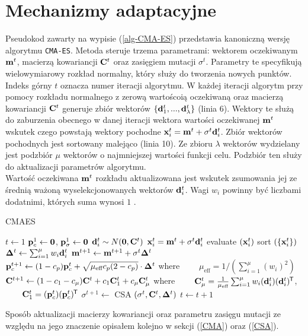 \section{Mechanizmy adaptacyjne}
\label{section:adaptacja}
Pseudokod zawarty na wypisie (\ref{alg-CMA-ES}) przedstawia kanoniczną wersję algorytmu \texttt{CMA-ES}. Metoda steruje trzema parametrami: wektorem oczekiwanym ${\bf m}^{t}$, macierzą kowariancji
${\bf C}^t$ oraz zasięgiem mutacji $\sigma^t$. Parametry te specyfikują wielowymiarowy rozkład normalny, który służy do tworzenia nowych punktów. Indeks górny $t$ oznacza numer iteracji algorytmu.
W każdej iteracji algorytm przy pomocy rozkładu normalnego z zerową wartoścoią oczekiwaną oraz macierzą kowariancji ${\bf C}^t$ generuje zbiór wektorów $\{{\bf d}_1^t,...,{\bf d}_\lambda^t\}$ (linia 6). 
Wektory te służą do zaburzenia obecnego w danej iteracji wektora wartości oczekiwanej ${\bf m}^t$ wskutek czego powstają wektory pochodne ${\bf x}^t_i={\bf m}^t+\sigma^t {\bf d}_i^t$.
Zbiór wektorów pochodnych jest sortowany malejąco (linia 10). Ze zbioru $\lambda$ wektorów wydzielany jest podzbiór $\mu$ wektorów o najmniejszej wartości funkcji celu. Podzbiór ten służy do
aktualizacji parametrów algorytmu. \\
Wartość oczekiwana ${\bf m}^t$ rozkładu aktualizowana jest wskutek zsumowania jej ze średnią ważoną wyselekcjonowanych wektorów ${\bf d}_{i}^{t}$. Wagi $w_{i}$ powinny być liczbami dodatnimi, których suma wynosi $1$ \cite{HansenOstermeier01}.

\begin{algorithm}
  \renewcommand{\thealgorithm}{}
  \caption{CMAES} \label{alg-CMA-ES}
  \begin{algorithmic}[1]
  \State $t \gets 1$
\State ${\bf p}_c^1 \gets {\bf 0}$, ${\bf p}_\sigma^1 \gets {\bf 0}$
      \State $ {\bf d}_i^t \sim N({\bf 0}, {\bf C}^t) $
      \State ${\bf x}_i^t={\bf m}^{t} + \sigma^t {\bf d}_i^t $
      \State evaluate $({\bf x}_i^t)$
   \EndFor
   \State sort $ \left(\{ {\bf x}_i^t \} \right) $
   \State ${\bf \Delta}^{t} \gets \sum_{i=1}^\mu w_i {\bf d}_i^t $
   \State ${\bf m}^{t+1} \gets {\bf m}^{t+1} + \sigma^t {\bf \Delta}^{t} $
   \State ${\bf p}_c^{t+1} \gets (1-c_p){\bf p}_c^t + \sqrt{\mu_\text{eff} c_p(2-c_p)} \cdot {\bf \Delta}^{t}$ where \newline
          $\qquad \mu_\text{eff}=1/\left(\sum_{i=1}^\mu (w_i)^2\right)$
   \State ${\bf C}^{t+1} \gets (1-c_1-c_\mu){\bf C}^t + c_1 {\bf C}^t_1 + c_\mu  {\bf C}^t_\mu$ where \newline
$\qquad {\bf C}_\mu^t=\frac{1}{\mu_\text{eff}}\sum_{i=1}^\mu w_i({\bf d}_i^t)({\bf d}_i^t)^{\mkern-1.5mu\mathsf{T}}$, \newline
$\qquad {\bf C}_1^t=({\bf p}_c^t)({\bf p}_c^t)^{\mkern-1.5mu\mathsf{T}}$
   \State $\sigma^{t+1} \gets $ CSA $(\sigma^t, {\bf C}^{t}, {\bf \Delta}^{t})$ 
   \State $t \gets t+1$
\EndWhile
\end{algorithmic}
\end{algorithm}
Sposób aktualizacji macierzy kowariancji oraz parametru zasięgu mutacji ze względu na jego znaczenie opisałem kolejno w sekcji (\ref{CMA}) oraz (\ref{CSA}).
